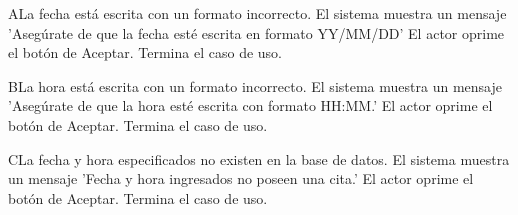 \begin{UCtrayectoriaA}{A}{La fecha está escrita con un formato incorrecto.}
			\UCpaso El sistema muestra un mensaje 'Asegúrate de que la fecha esté escrita en formato YY/MM/DD'
			\UCpaso El actor oprime el botón de Aceptar.
			\UCpaso[] Termina el caso de uso.
\end{UCtrayectoriaA}

\begin{UCtrayectoriaA}{B}{La hora está escrita con un formato incorrecto.}
			\UCpaso El sistema muestra un mensaje 'Asegúrate de que la hora esté escrita con formato HH:MM.'
			\UCpaso El actor oprime el botón de Aceptar.
			\UCpaso[] Termina el caso de uso.
\end{UCtrayectoriaA}

\begin{UCtrayectoriaA}{C}{La fecha y hora especificados no existen en la base de datos.}
			\UCpaso El sistema muestra un mensaje 'Fecha y hora ingresados no poseen una cita.'
			\UCpaso El actor oprime el botón de Aceptar.
			\UCpaso[] Termina el caso de uso.
\end{UCtrayectoriaA}
